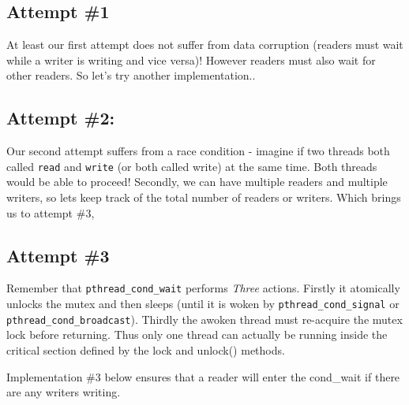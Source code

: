 \subsection{Attempt \#1}\label{attempt-1}

At least our first attempt does not suffer from data corruption (readers
must wait while a writer is writing and vice versa)! However readers
must also wait for other readers. So let's try another implementation..

\subsection{Attempt \#2:}\label{attempt-2}

Our second attempt suffers from a race condition - imagine if two
threads both called \texttt{read} and \texttt{write} (or both called
write) at the same time. Both threads would be able to proceed!
Secondly, we can have multiple readers and multiple writers, so lets
keep track of the total number of readers or writers. Which brings us to
attempt \#3,

\subsection{Attempt \#3}\label{attempt-3}

Remember that \texttt{pthread\_cond\_wait} performs \emph{Three}
actions. Firstly it atomically unlocks the mutex and then sleeps (until
it is woken by \texttt{pthread\_cond\_signal} or
\texttt{pthread\_cond\_broadcast}). Thirdly the awoken thread must
re-acquire the mutex lock before returning. Thus only one thread can
actually be running inside the critical section defined by the lock and
unlock() methods.

Implementation \#3 below ensures that a reader will enter the cond\_wait
if there are any writers writing.

\begin{Shaded}
\begin{Highlighting}[]
     


\NormalTok{\}}
\end{Highlighting}
\end{Shaded}

